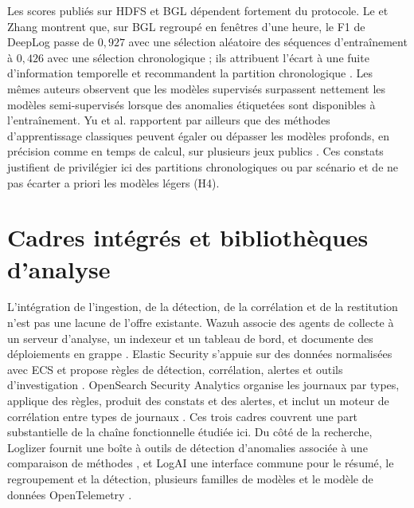 Les scores publiés sur HDFS et BGL dépendent fortement du protocole. Le et Zhang montrent que, sur BGL regroupé en fenêtres d'une heure, le F1 de DeepLog passe de $0{,}927$ avec une sélection aléatoire des séquences d'entraînement à $0{,}426$ avec une sélection chronologique ; ils attribuent l'écart à une fuite d'information temporelle et recommandent la partition chronologique \cite{le2022logbased}. Les mêmes auteurs observent que les modèles supervisés surpassent nettement les modèles semi-supervisés lorsque des anomalies étiquetées sont disponibles à l'entraînement. Yu et al. rapportent par ailleurs que des méthodes d'apprentissage classiques peuvent égaler ou dépasser les modèles profonds, en précision comme en temps de calcul, sur plusieurs jeux publics \cite{yu2024deep}. Ces constats justifient de privilégier ici des partitions chronologiques ou par scénario et de ne pas écarter a priori les modèles légers (H4).

\section{Cadres intégrés et bibliothèques d'analyse}

L'intégration de l'ingestion, de la détection, de la corrélation et de la restitution n'est pas une lacune de l'offre existante. Wazuh associe des agents de collecte à un serveur d'analyse, un indexeur et un tableau de bord, et documente des déploiements en grappe \cite{wazuh2026architecture}. Elastic Security s'appuie sur des données normalisées avec ECS et propose règles de détection, corrélation, alertes et outils d'investigation \cite{elastic2026ecs,elastic2026security}. OpenSearch Security Analytics organise les journaux par types, applique des règles, produit des constats et des alertes, et inclut un moteur de corrélation entre types de journaux \cite{opensearch2026securityanalytics}. Ces trois cadres couvrent une part substantielle de la chaîne fonctionnelle étudiée ici. Du côté de la recherche, Loglizer fournit une boîte à outils de détection d'anomalies associée à une comparaison de méthodes \cite{he2016experience,logpai2026loglizer}, et LogAI une interface commune pour le résumé, le regroupement et la détection, plusieurs familles de modèles et le modèle de données OpenTelemetry \cite{cheng2023logai}.

